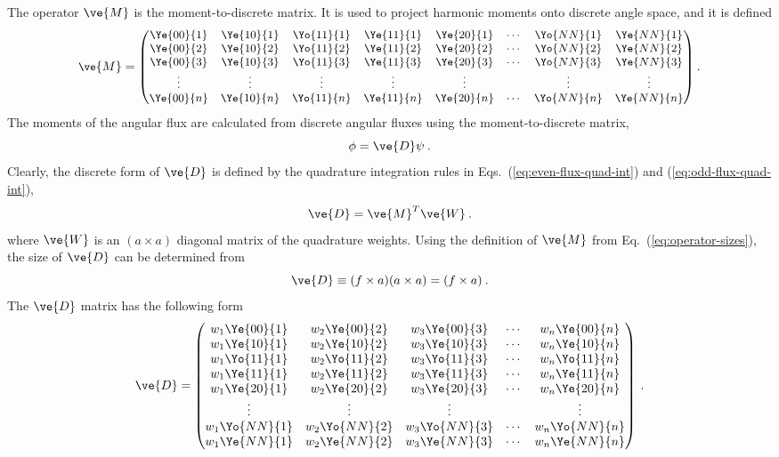 \documentclass{article}
\numberwithin{equation}{subsection}
\begin{document}
The operator $\ve{M}$ is the moment-to-discrete matrix. It is used to project
harmonic moments onto discrete angle space, and it is defined
\begin{equation}
  {\small
    \ve{M} = \begin{pmatrix}
      \Ye{00}{1} & \Ye{10}{1} & \Yo{11}{1} & \Ye{11}{1} &
      \Ye{20}{1} & \cdots & \Yo{NN}{1} & \Ye{NN}{1} \\
      \Ye{00}{2} & \Ye{10}{2} & \Yo{11}{2} & \Ye{11}{2} &
      \Ye{20}{2} & \cdots & \Yo{NN}{2} & \Ye{NN}{2} \\
      \Ye{00}{3} & \Ye{10}{3} & \Yo{11}{3} & \Ye{11}{3} &
      \Ye{20}{3} & \cdots & \Yo{NN}{3} & \Ye{NN}{3} \\
      \vdots     & \vdots     & \vdots     & \vdots     &
      \vdots     &        & \vdots     & \vdots     \\
      \Ye{00}{n} & \Ye{10}{n} & \Yo{11}{n} & \Ye{11}{n} &
      \Ye{20}{n} & \cdots & \Yo{NN}{n} & \Ye{NN}{n}
  \end{pmatrix}}\:.
\end{equation}
The moments of the angular flux are calculated from discrete angular fluxes
using the moment-to-discrete matrix,
\begin{equation}
  \phi = \ve{D}\psi\:.
\end{equation}
Clearly, the discrete form of $\ve{D}$ is defined by the quadrature
integration rules in Eqs.~(\ref{eq:even-flux-quad-int}) and
(\ref{eq:odd-flux-quad-int}),
\begin{equation}
    \ve{D} = \ve{M}^{T}\ve{W}\:.
\end{equation}
where $\ve{W}$ is an $(a\times a)$ diagonal matrix of the quadrature weights.
Using the definition of $\ve{M}$ from Eq.~(\ref{eq:operator-sizes}), the size
of $\ve{D}$ can be determined from
\begin{equation}
  \ve{D} \equiv (f\times a)(a\times a) = (f\times a)\:.
\end{equation}
The $\ve{D}$ matrix has the following form
\begin{equation}
  \ve{D} = \begin{pmatrix}
    w_1\Ye{00}{1} & w_2\Ye{00}{2} & w_3\Ye{00}{3} & \cdots & w_n\Ye{00}{n} \\
    w_1\Ye{10}{1} & w_2\Ye{10}{2} & w_3\Ye{10}{3} & \cdots & w_n\Ye{10}{n} \\
    w_1\Yo{11}{1} & w_2\Yo{11}{2} & w_3\Yo{11}{3} & \cdots & w_n\Yo{11}{n} \\
    w_1\Ye{11}{1} & w_2\Ye{11}{2} & w_3\Ye{11}{3} & \cdots & w_n\Ye{11}{n} \\
    w_1\Ye{20}{1} & w_2\Ye{20}{2} & w_3\Ye{20}{3} & \cdots & w_n\Ye{20}{n} \\
    \vdots & \vdots & \vdots & & \vdots \\
    w_1\Yo{NN}{1} & w_2\Yo{NN}{2} & w_3\Yo{NN}{3} & \cdots & w_n\Yo{NN}{n} \\
    w_1\Ye{NN}{1} & w_2\Ye{NN}{2} & w_3\Ye{NN}{3} & \cdots & w_n\Ye{NN}{n}
  \end{pmatrix}\:.
\end{equation}
\end{document}
